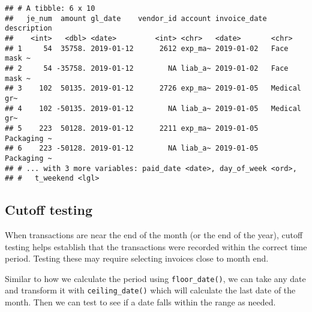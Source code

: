 \documentclass[
]{book}
\newenvironment{Shaded}{\begin{snugshade}}{\end{snugshade}}
\newcommand{\CommentTok}[1]{\textcolor[rgb]{0.56,0.35,0.01}{\textit{#1}}}
\newcommand{\DataTypeTok}[1]{\textcolor[rgb]{0.13,0.29,0.53}{#1}}
\newcommand{\KeywordTok}[1]{\textcolor[rgb]{0.13,0.29,0.53}{\textbf{#1}}}
\newcommand{\NormalTok}[1]{#1}
\newcommand{\OperatorTok}[1]{\textcolor[rgb]{0.81,0.36,0.00}{\textbf{#1}}}
\newcommand{\OtherTok}[1]{\textcolor[rgb]{0.56,0.35,0.01}{#1}}
\newcommand{\StringTok}[1]{\textcolor[rgb]{0.31,0.60,0.02}{#1}}
\begin{document}
\begin{Shaded}
\end{Shaded}

\begin{verbatim}
## # A tibble: 6 x 10
##   je_num  amount gl_date    vendor_id account invoice_date description
##    <int>   <dbl> <date>         <int> <chr>   <date>       <chr>      
## 1     54  35758. 2019-01-12      2612 exp_ma~ 2019-01-02   Face mask ~
## 2     54 -35758. 2019-01-12        NA liab_a~ 2019-01-02   Face mask ~
## 3    102  50135. 2019-01-12      2726 exp_ma~ 2019-01-05   Medical gr~
## 4    102 -50135. 2019-01-12        NA liab_a~ 2019-01-05   Medical gr~
## 5    223  50128. 2019-01-12      2211 exp_ma~ 2019-01-05   Packaging ~
## 6    223 -50128. 2019-01-12        NA liab_a~ 2019-01-05   Packaging ~
## # ... with 3 more variables: paid_date <date>, day_of_week <ord>,
## #   t_weekend <lgl>
\end{verbatim}

\hypertarget{cutoff-testing}{%
\subsection{Cutoff testing}\label{cutoff-testing}}

When transactions are near the end of the month (or the end of the year), cutoff testing helps establish that the transactions were recorded within the correct time period. Testing these may require selecting invoices close to month end.

Similar to how we calculate the period using \texttt{floor\_date()}, we can take any date and transform it with \texttt{ceiling\_date()} which will calculate the last date of the month. Then we can test to see if a date falls within the range as needed.
\end{document}
